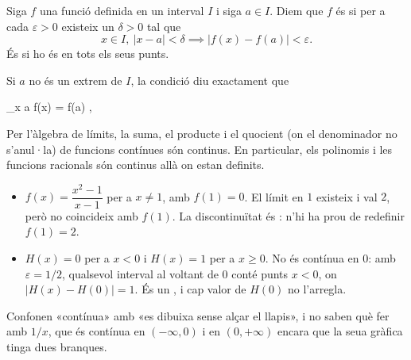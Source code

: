
\begin{frame}

\begin{definition}[Continuïtat]
Siga $f$ una funció definida en un interval $I$ i siga $a \in I$. Diem que
$f$ és  si per a cada $\varepsilon > 0$ existeix un
$\delta > 0$ tal que
\[
  x \in I, \ |x - a| < \delta \implies |f(x) - f(a)| < \varepsilon .
\]
És  si ho és en tots els seus punts.
\end{definition}

Si $a$ no és un extrem de $I$, la condició diu exactament que
\begin{keyformula}
  \lim_{x \to a} f(x) = f(a) ,
\end{keyformula}
\end{frame}

\begin{frame}

\begin{remark}
Per l'àlgebra de límits, la suma, el producte i el quocient (on el
denominador no s'anul·la) de funcions contínues són continus. En particular,
els polinomis i les funcions racionals són continus allà on estan definits.
\end{remark}

\dpause

\begin{example}
\begin{itemize}
  \item $f(x) = \dfrac{x^2 - 1}{x - 1}$ per a $x \neq 1$, amb $f(1) = 0$. El
        límit en $1$ existeix i val $2$, però no coincideix amb $f(1)$. La
        discontinuïtat és : n'hi ha prou de redefinir
        $f(1) = 2$.
  \item $H(x) = 0$ per a $x < 0$ i $H(x) = 1$ per a $x \geq 0$. No és
        contínua en $0$: amb $\varepsilon = 1/2$, qualsevol interval al
        voltant de $0$ conté punts $x < 0$, on $|H(x) - H(0)| = 1$. És un
        , i cap valor de $H(0)$ no l'arregla.
\end{itemize}
\end{example}

\begin{commonmistake}
Confonen «contínua» amb «es dibuixa sense alçar el llapis», i no saben què
fer amb $1/x$, que és contínua en $(-\infty, 0)$ i en $(0, +\infty)$ encara
que la seua gràfica tinga dues branques.
\end{commonmistake}
\end{frame}
